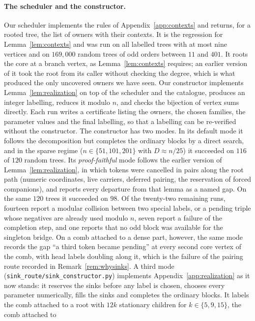 \documentclass[11pt,a4paper]{article}
\theoremstyle{plain}
\theoremstyle{definition}
\theoremstyle{remark}
\newcommand{\file}[1]{\texttt{#1}}
\begin{document}
\paragraph{The scheduler and the constructor.}
Our scheduler implements the rules of Appendix~\ref{app:contexts} and returns,
for a rooted tree, the list of owners with their contexts.  It is the
regression for Lemma~\ref{lem:contexts} and was run on all labelled trees with
at most nine vertices and on $169{,}000$ random trees of odd orders between
$11$ and $401$.  It roots the core at a branch vertex, as
Lemma~\ref{lem:contexts} requires; an earlier version of it took the root from
its caller without checking the degree, which is what produced the only
uncovered owners we have seen.  Our constructor
implements Lemma~\ref{lem:realization} on top of the scheduler and the
catalogue, produces an integer labelling, reduces it modulo $n$, and checks
the bijection of vertex sums directly.  Each run writes a certificate listing
the owners, the chosen families, the parameter values and the final
labelling, so that a labelling can be re-verified without the constructor.
The constructor has two modes.  In its default mode it follows the
decomposition but completes the ordinary blocks by a direct search, and in
the sparse regime ($n\in\{51,101,201\}$ with $D\approx n/25$) it succeeded
on $116$ of $120$ random trees.  Its \emph{proof-faithful} mode follows the
earlier version of Lemma~\ref{lem:realization}, in which tokens were cancelled
in pairs along the root path (numeric coordinates, live carriers, deferred
pairing, the reservation of forced companions), and reports every departure
from that lemma as a named gap.  On the same $120$ trees it succeeded on $98$.
Of the twenty-two remaining runs, fourteen report a modular collision between
two special labels, or a pending triple whose negatives are already used
modulo $n$, seven report a failure of the completion step, and one reports
that no odd block was available for the singleton bridge.  On a comb attached
to a dense part, however, the same mode records the gap ``a third token became
pending'' at every second core vertex of the comb, with head labels doubling
along it, which is the failure of the pairing route recorded in
Remark~\ref{rem:whysinks}.  A third mode (\file{sink\_route/sink\_constructor.py})
implements Appendix~\ref{app:realization} as it now stands: it reserves the
sinks before any label is chosen, chooses every parameter numerically, fills
the sinks and completes the ordinary blocks.  It labels the comb attached to a
root with $12k$ stationary children for $k\in\{5,9,15\}$, the comb attached to
\end{document}
